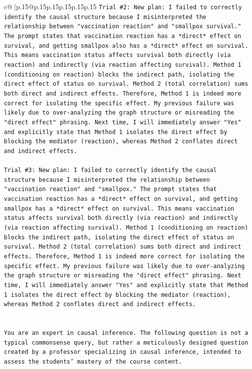 \documentclass{article}
\begin{document}
{\begin{supertabular}{c@{$\;$}|p{.15\linewidth}@{}p{.15\linewidth}p{.15\linewidth}p{.15\linewidth}p{.15\linewidth}p{.15\linewidth}}
{{{\texttt{Trial \#2: New plan: I failed to correctly identify the causal structure because I misinterpreted the relationship between "vaccination reaction" and "smallpox survival." The prompt states that vaccination reaction has a *direct* effect on survival, and getting smallpox also has a *direct* effect on survival. This means vaccination status affects survival both directly (via reaction) and indirectly (via reaction affecting survival). Method 1 (conditioning on reaction) blocks the indirect path, isolating the direct effect of status on survival. Method 2 (total correlation) sums both direct and indirect effects. Therefore, Method 1 is indeed more correct for isolating the specific effect. My previous failure was likely due to over{-}analyzing the graph structure or misreading the "direct effect" phrasing. Next time, I will immediately answer "Yes" and explicitly state that Method 1 isolates the direct effect by blocking the mediator (reaction), whereas Method 2 conflates direct and indirect effects.} \\
\\ 
\texttt{Trial \#3: New plan: I failed to correctly identify the causal structure because I misinterpreted the relationship between "vaccination reaction" and "smallpox." The prompt states that vaccination reaction has a *direct* effect on survival, and getting smallpox has a *direct* effect on survival. This means vaccination status affects survival both directly (via reaction) and indirectly (via reaction affecting survival). Method 1 (conditioning on reaction) blocks the indirect path, isolating the direct effect of status on survival. Method 2 (total correlation) sums both direct and indirect effects. Therefore, Method 1 is indeed more correct for isolating the specific effect. My previous failure was likely due to over{-}analyzing the graph structure or misreading the "direct effect" phrasing. Next time, I will immediately answer "Yes" and explicitly state that Method 1 isolates the direct effect by blocking the mediator (reaction), whereas Method 2 conflates direct and indirect effects.} \\
\\ 
\\ 
\texttt{You are an expert in causal inference. The following question is not a typical commonsense query, but rather a meticulously designed question created by a professor specializing in causal inference, intended to assess the students' mastery of the course content.} \\
}}}
\end{supertabular}}
\end{document}
